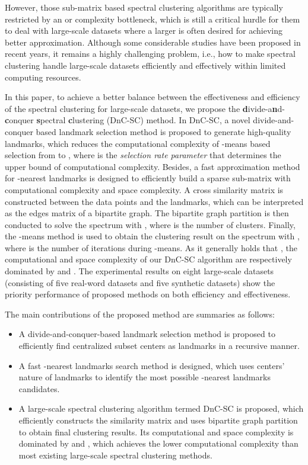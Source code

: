 \documentclass[a4paper,fleqn]{cas-dc}
\begin{document}
However, those sub-matrix based spectral clustering algorithms are typically restricted by an  or  complexity bottleneck, which is still a critical hurdle for them to deal with large-scale datasets where a larger  is often desired for achieving better approximation.
Although some considerable studies have been proposed in recent years, it remains a highly challenging problem, i.e., how to make spectral clustering handle large-scale datasets efficiently and effectively within limited computing resources.

In this paper, to achieve a better balance between the effectiveness and efficiency of the spectral clustering for large-scale datasets, we propose the \textbf{d}ivide-a\textbf{n}d-\textbf{c}onquer \textbf{s}pectral \textbf{c}lustering (DnC-SC) method.
In DnC-SC, a novel divide-and-conquer based landmark selection method is proposed to generate high-quality  landmarks, which reduces the computational complexity of -means based selection from  to , where  is the \textit{selection rate parameter} that determines the upper bound of computational complexity.
Besides, a fast approximation method for -nearest landmarks is designed to efficiently build a sparse sub-matrix with  computational complexity and  space complexity.
A cross similarity matrix is constructed between the data points and the  landmarks, which can be interpreted as the edges matrix of a bipartite graph.
The bipartite graph partition is then conducted to solve the spectrum with , where  is the number of clusters.
Finally, the -means method is used to obtain the clustering result on the spectrum with , where  is the number of iterations during -means.
As it generally holds that , the computational and space complexity of our DnC-SC algorithm are respectively dominated by  and .
The experimental results on eight large-scale datasets (consisting of five real-word datasets and five synthetic datasets) show the priority performance of proposed methods on both efficiency and effectiveness.

The main contributions of the proposed method are summaries as follows: 

\begin{itemize}
  \item A divide-and-conquer-based landmark selection method is proposed to efficiently find  centralized subset centers as landmarks in a recursive manner.
  \item A fast -nearest landmarks search method is designed, which uses centers' nature of landmarks to identify the most possible -nearest landmarks candidates.
  \item A large-scale spectral clustering algorithm termed DnC-SC is proposed, which efficiently constructs the similarity matrix and uses bipartite graph partition to obtain final clustering results. Its computational and space complexity is dominated by  and , which achieves the lower computational complexity than most existing large-scale spectral clustering methods.

  
\end{itemize} 
\end{document}
